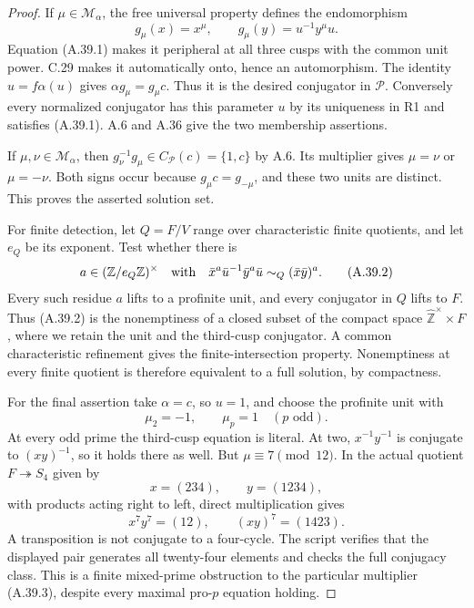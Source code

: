 \begin{proof}
If \(\mu\in\mathcal M_\alpha\), the free universal
property defines the endomorphism
\[
       g_\mu(x)=x^\mu,\qquad
       g_\mu(y)=u^{-1}y^\mu u.
\]
Equation (A.39.1) makes it peripheral at all three
cusps with the common unit power. C.29 makes it
automatically onto, hence an automorphism.
The identity \(u=f\alpha(u)\) gives
\(\alpha g_\mu=g_\mu c\). Thus it is the desired
conjugator in \(\mathcal P\). Conversely every
normalized conjugator has this parameter \(u\)
by its uniqueness in R1 and satisfies (A.39.1).
A.6 and A.36 give the two membership assertions.

If \(\mu,\nu\in\mathcal M_\alpha\), then
\(g_\nu^{-1}g_\mu\in C_{\mathcal P}(c)=\{1,c\}\)
by A.6. Its multiplier gives \(\mu=\nu\) or
\(\mu=-\nu\). Both signs occur because
\(g_\mu c=g_{-\mu}\), and these two units are
distinct. This proves the asserted solution set.

For finite detection, let \(Q=F/V\) range over
characteristic finite quotients, and let
\(e_Q\) be its exponent. Test whether there is
\[
 a\in(\mathbb Z/e_Q\mathbb Z)^{\times}
 \quad\hbox{with}\quad
 \bar x^a\bar u^{-1}\bar y^a\bar u
          \sim_Q(\bar x\bar y)^a.
 \tag{A.39.2}
\]
Every such residue \(a\) lifts to a profinite unit,
and every conjugator in \(Q\) lifts to \(F\).
Thus (A.39.2) is the nonemptiness of a closed subset
of the compact space
\(\widehat{\mathbb Z}^{\times}\times F\), where
we retain the unit and the third-cusp conjugator.
A common characteristic refinement gives the
finite-intersection property. Nonemptiness at
every finite quotient is therefore equivalent
to a full solution, by compactness.

For the final assertion take \(\alpha=c\), so
\(u=1\), and choose the profinite unit with
\[
          \mu_2=-1,\qquad \mu_p=1\quad(p\text{ odd}).
 \tag{A.39.3}
\]
At every odd prime the third-cusp equation is
literal. At two, \(x^{-1}y^{-1}\) is conjugate
to \((xy)^{-1}\), so it holds there as well.
But \(\mu\equiv7\pmod{12}\). In the actual
quotient \(F\twoheadrightarrow S_4\) given by
\[
                x=(234),\qquad y=(1234),
\]
with products acting right to left, direct
multiplication gives
\[
     x^7y^7=(12),\qquad (xy)^7=(1423).
 \tag{A.39.4}
\]
A transposition is not conjugate to a four-cycle.
The script  verifies
that the displayed pair generates all twenty-four
elements and checks the full conjugacy class.
This is a finite mixed-prime obstruction to the
particular multiplier (A.39.3), despite every
maximal pro-\(p\) equation holding.
\end{proof}

